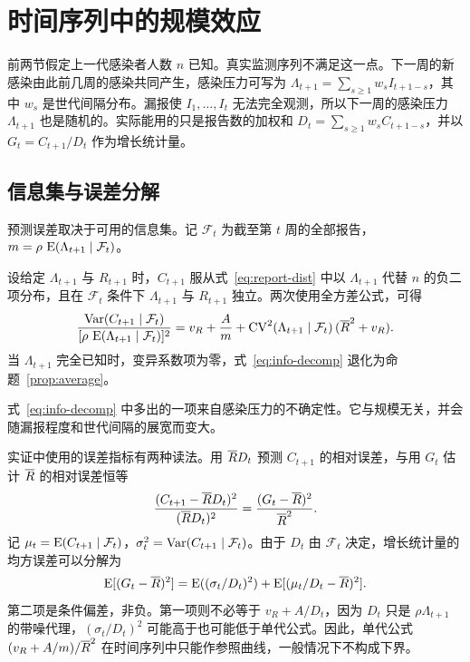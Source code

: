 \section{时间序列中的规模效应}
\label{sec:renewal}

前两节假定上一代感染者人数 $n$ 已知。真实监测序列不满足这一点。下一周的新感染由此前几周的感染共同产生，感染压力可写为 $\Lambda_{t+1}=\sum_{s\geq1}w_sI_{t+1-s}$，其中 $w_s$ 是世代间隔分布。漏报使 $I_1,\dots,I_t$ 无法完全观测，所以下一周的感染压力 $\Lambda_{t+1}$ 也是随机的。实际能用的只是报告数的加权和 $D_t=\sum_{s\geq1}w_sC_{t+1-s}$，并以 $G_t=C_{t+1}/D_t$ 作为增长统计量。

\subsection{信息集与误差分解}
\label{sec:renewal-decomp}

预测误差取决于可用的信息集。记 $\mathcal F_t$ 为截至第 $t$ 周的全部报告，$m=\rho\,\operatorname{E}(\Lambda_{t+1}\mid\mathcal F_t)$。

\begin{remark}
\label{rem:information}
设给定 $\Lambda_{t+1}$ 与 $R_{t+1}$ 时，$C_{t+1}$ 服从式~\eqref{eq:report-dist} 中以 $\Lambda_{t+1}$ 代替 $n$ 的负二项分布，且在 $\mathcal F_t$ 条件下 $\Lambda_{t+1}$ 与 $R_{t+1}$ 独立。两次使用全方差公式，可得
\begin{equation}
  \frac{\operatorname{Var}(C_{t+1}\mid\mathcal F_t)}{[\rho\,\operatorname{E}(\Lambda_{t+1}\mid\mathcal F_t)]^2}
  =v_R+\frac{A}{m}+\operatorname{CV}^2(\Lambda_{t+1}\mid\mathcal F_t)\,(\overline{R}^2+v_R).
  \label{eq:info-decomp}
\end{equation}
当 $\Lambda_{t+1}$ 完全已知时，变异系数项为零，式~\eqref{eq:info-decomp} 退化为命题~\ref{prop:average}。
\end{remark}

式~\eqref{eq:info-decomp} 中多出的一项来自感染压力的不确定性。它与规模无关，并会随漏报程度和世代间隔的展宽而变大。

实证中使用的误差指标有两种读法。用 $\overline{R} D_t$ 预测 $C_{t+1}$ 的相对误差，与用 $G_t$ 估计 $\overline{R}$ 的相对误差恒等
\begin{equation}
  \frac{(C_{t+1}-\overline{R} D_t)^2}{(\overline{R} D_t)^2}=\frac{(G_t-\overline{R})^2}{\overline{R}^2}.
  \label{eq:identity}
\end{equation}
记 $\mu_t=\operatorname{E}(C_{t+1}\mid\mathcal F_t)$，$\sigma_t^2=\operatorname{Var}(C_{t+1}\mid\mathcal F_t)$。由于 $D_t$ 由 $\mathcal F_t$ 决定，增长统计量的均方误差可以分解为
\begin{equation}
  \operatorname{E}[(G_t-\overline{R})^2]=\operatorname{E}((\sigma_t/D_t)^2)+\operatorname{E}[(\mu_t/D_t-\overline{R})^2].
  \label{eq:mse-decomp}
\end{equation}
第二项是条件偏差，非负。第一项则不必等于 $v_R+A/D_t$，因为 $D_t$ 只是 $\rho\Lambda_{t+1}$ 的带噪代理，$(\sigma_t/D_t)^2$ 可能高于也可能低于单代公式。因此，单代公式 $(v_R+A/m)/\overline{R}^2$ 在时间序列中只能作参照曲线，一般情况下不构成下界。

